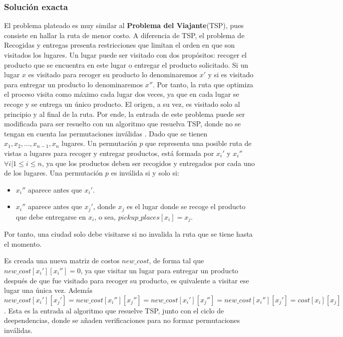 \documentclass[twocolumn, fontsize=10pt]{article}
\begin{document}
\subsubsection{Solución exacta}
El problema plateado es muy similar al \textbf{Problema del Viajante}(TSP)\cite{Applegate2006}, pues consiste en hallar la ruta de menor costo. A diferencia de TSP, el problema de Recogidas y entregas presenta restricciones que limitan el orden en que son visitados los lugares. 
Un lugar puede ser visitado con dos propósitos: recoger el producto que se encuentra en este lugar o entregar el producto solicitado. Si un lugar \(x\) es visitado para recoger su producto lo denominaremos \(x'\) y si es visitado para entregar un producto lo denominaremos \(x''\). Por tanto, la ruta que optimiza el proceso visita como máximo cada lugar dos veces, ya que en cada lugar se recoge y se entrega un único producto. El origen, a su vez, es visitado solo al principio y al final de la ruta. Por ende, la entrada de este problema puede ser modificada para ser resuelto con un algoritmo que resuelva TSP, donde no se tengan en cuenta las permutaciones inválidas . Dado que se tienen \(x_1,x_2,...,x_{n-1},x_n\) lugares. Un permutación \(p\) que representa una posible ruta de vistas a lugares para recoger y entregar productos, está formada por \(x_i'\) y \(x_i''\) \(\forall i |  1 \leq i \leq n\), ya que los productos deben ser recogidos y entregados por cada uno de los lugares. Una permutación \(p\) es inválida  si y solo si:
\begin{itemize}
    \item \(x_i''\) aparece antes que \(x_i'\).
    \item \(x_i''\) aparece antes que \(x_j'\), donde \(x_j\) es el lugar donde se recoge el producto que debe entregarse en \(x_i\), o sea, \(pickup\_places[x_i]=x_j\).
\end{itemize}

Por tanto, una ciudad solo debe visitarse si no invalida la ruta que se tiene hasta el momento.

Es creada una nueva matriz de costos \(new\_cost\), de forma tal que \(new\_cost[x_i'][x_i'']=0\), ya que visitar un lugar para entregar un producto después de que fue visitado para recoger su producto, es quivalente a visitar ese lugar una única vez. Además \(new\_cost[x_i'][x_j']=new\_cost[x_i''][x_j'']=new\_cost[x_i'][x_j'']=new\_cost[x_i''][x_j']=cost[x_i][x_j]\). Esta es la entrada al algoritmo que resuelve TSP, junto con el ciclo de deependencias, donde se añaden verificaciones para no formar permutaciones inválidas. 
\end{document}
